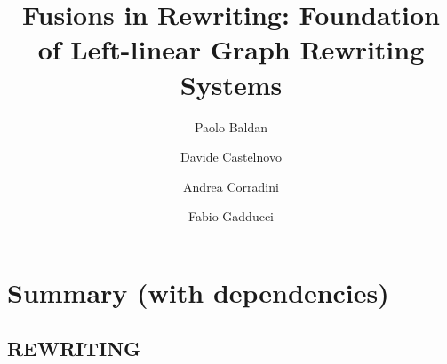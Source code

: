 \documentclass[a4paper,UKenglish,cleveref,pdftex, thm-restate,numberwithinsect]{lipics}
\title{Fusions in Rewriting: Foundation of Left-linear Graph Rewriting Systems}
\author{Paolo Baldan} 
{Department of Mathematics, University of Padova, Italy}
{baldan@math.unipd.it}{}{}
\author{Davide Castelnovo}
{Department of Mathematics, University of Padova, Italy}
{davide.castelnovo@math.unipd.it}{}{}
\author{Andrea Corradini}
{Department of Computer Science, University of Pisa, Italy}
{andrea.corradini@unipi.it}{}{}
\author{Fabio Gadducci}
{Department of Computer Science, University of Pisa, Italy}
{fabio.gadducci@unipi.it}{}{}
\begin{document}
\maketitle



\begin{abstract}
\end{abstract}


\iffalse \section*{Summary (with dependencies)}

\subsection*{REWRITING}
\end{document}
